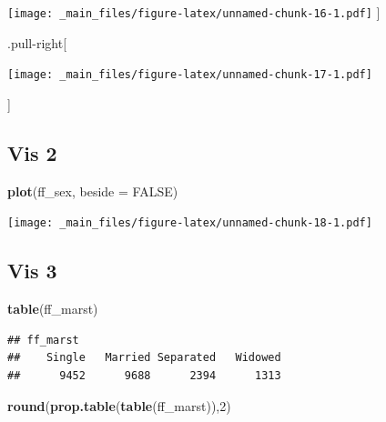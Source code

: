 \documentclass[
]{book}
\newenvironment{Shaded}{\begin{snugshade}}{\end{snugshade}}
\newcommand{\AttributeTok}[1]{\textcolor[rgb]{0.13,0.29,0.53}{#1}}
\newcommand{\ConstantTok}[1]{\textcolor[rgb]{0.56,0.35,0.01}{#1}}
\newcommand{\DecValTok}[1]{\textcolor[rgb]{0.00,0.00,0.81}{#1}}
\newcommand{\FunctionTok}[1]{\textcolor[rgb]{0.13,0.29,0.53}{\textbf{#1}}}
\newcommand{\NormalTok}[1]{#1}
\newcommand{\SpecialCharTok}[1]{\textcolor[rgb]{0.81,0.36,0.00}{\textbf{#1}}}
\begin{document}
\texttt{[image: \_main\_files/figure-latex/unnamed-chunk-16-1.pdf]}
{]}

.pull-right{[}

\begin{Shaded}
\end{Shaded}

\texttt{[image: \_main\_files/figure-latex/unnamed-chunk-17-1.pdf]}

{]}

\hypertarget{vis-2}{%
\subsection{Vis 2}\label{vis-2}}

\begin{Shaded}
\begin{Highlighting}[]
\FunctionTok{plot}\NormalTok{(ff\_sex, }\AttributeTok{beside =} \ConstantTok{FALSE}\NormalTok{)}
\end{Highlighting}
\end{Shaded}

\texttt{[image: \_main\_files/figure-latex/unnamed-chunk-18-1.pdf]}

\hypertarget{vis-3}{%
\subsection{Vis 3}\label{vis-3}}

\begin{Shaded}
\begin{Highlighting}[]
\FunctionTok{table}\NormalTok{(ff\_marst)}
\end{Highlighting}
\end{Shaded}

\begin{verbatim}
## ff_marst
##    Single   Married Separated   Widowed 
##      9452      9688      2394      1313
\end{verbatim}

\begin{Shaded}
\begin{Highlighting}[]
\FunctionTok{round}\NormalTok{(}\FunctionTok{prop.table}\NormalTok{(}\FunctionTok{table}\NormalTok{(ff\_marst)),}\DecValTok{2}\NormalTok{)}
\end{Highlighting}
\end{Shaded}
\end{document}

